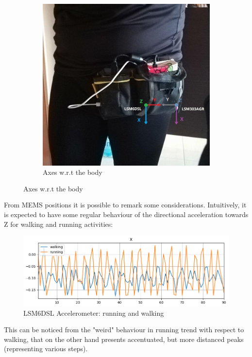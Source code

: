 \begin{center}
\begin{figure}[H]
\begin{subfigure}[H]{0.45\textwidth}
			\includegraphics[scale=0.45]{figures/sensor_orientation.jpg}
			\caption{Axes w.r.t the body}\label{fig:4b}
		\end{subfigure}
	\end{figure} 
\end{center}
From MEMS positions it is possible to remark some considerations. Intuitively, it is expected to have some regular behaviour of the directional acceleration towards Z for walking and running activities:
\begin{figure}[H]
		\hfill\includegraphics[scale=0.8]{figures/plot_ACC_LSM6DSL_DS_walking_running_X.png}\hspace*{\fill}
		\caption{LSM6DSL Accelerometer: running and walking}\label{fig:5}
		\centering
\end{figure}
This can be noticed from the "weird" behaviour in running trend with respect to walking, that on the other hand presents accentuated, but more distanced peaks (representing various steps).\newline
